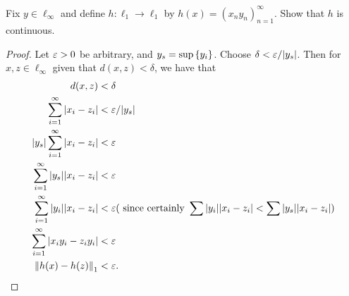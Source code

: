 \documentclass{exam}
\begin{document}
\begin{questions}
    \newpage
    \question Fix $y\in \ell_\infty$ and define $h: \ell_1\to\ell_1$ by $h(x) = (x_ny_n)_{n = 1}^\infty$. Show that $h$ is continuous.
    \begin{proof}
        Let $\varepsilon > 0$ be arbitrary, and $y_s = \sup \left \{ y_i \right \}$. Choose $\delta < \varepsilon / |y_s|$. Then for $x, z\in \ell_\infty$ given that $d(x, z) < \delta$, we have that
        \begin{align*}
            d(x, z) &< \delta \\
            \sum_{i = 1}^\infty |x_i - z_i| &< \varepsilon / |y_s| \\
            |y_s|\sum_{i = 1}^\infty |x_i - z_i| &< \varepsilon \\
            \sum_{i = 1}^\infty |y_s||x_i - z_i| &< \varepsilon \\
            \sum_{i = 1}^\infty |y_i||x_i - z_i| &< \varepsilon (\text{ since certainly } \sum |y_i||x_i - z_i| < \sum |y_s||x_i - z_i|)\\
            \sum_{i = 1}^\infty |x_iy_i - z_iy_i| &< \varepsilon \\
            \left\| h(x) - h(z) \right\|_1 &< \varepsilon.
        \end{align*}
    \end{proof}


\end{questions}
\end{document}
